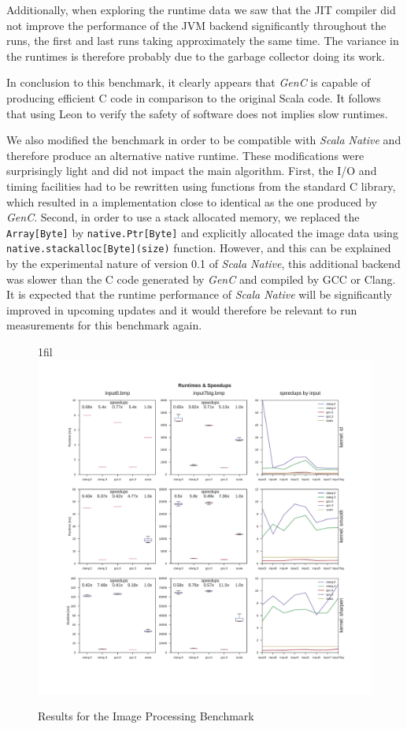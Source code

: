 \documentclass[a4paper,twoside]{article}
\makeatletter
\newcommand{\InlineS}[1]{\lstinline[language=Leon]|#1|}
\newcommand*{\centerfloat}{%
  \parindent \z@
  \leftskip \z@ \@plus 1fil \@minus \textwidth
  \rightskip\leftskip
  \parfillskip \z@skip}
\newcommand{\GenC}{\emph{GenC}\xspace}
\makeatother
\begin{document}
Additionally, when exploring the runtime data we saw that the JIT compiler did
not improve the performance of the JVM backend significantly throughout the
runs, the first and last runs taking approximately the same time. The variance
in the runtimes is therefore probably due to the garbage collector doing its
work.

In conclusion to this benchmark, it clearly appears that \GenC is capable of
producing efficient C code in comparison to the original Scala code. It follows
that using Leon to verify the safety of software does not implies slow runtimes.

We also modified the benchmark in order to be compatible with \emph{Scala
Native}\cite{scala_native} and therefore produce an alternative native runtime.
These modifications were surprisingly light and did not impact the main
algorithm. First, the I/O and timing facilities had to be rewritten using
functions from the standard C library, which resulted in a implementation close
to identical as the one produced by \GenC. Second, in order to use a stack
allocated memory, we replaced the \InlineS{Array[Byte]} by
\InlineS{native.Ptr[Byte]} and explicitly allocated the image data using
\InlineS{native.stackalloc[Byte](size)} function. However, and this can be
explained by the experimental nature of version 0.1 of \emph{Scala Native}, this
additional backend was slower than the C code generated by \GenC and compiled by
GCC or Clang. It is expected that the runtime performance of \emph{Scala Native}
will be significantly improved in upcoming updates and it would therefore be
relevant to run measurements for this benchmark again.


\begin{figure}[!h]
  \centerfloat
  \includegraphics[width=1.25\textwidth]{res/improc_results.pdf}
  \caption{Results for the Image Processing Benchmark}
  \label{fig:improc-res}
\end{figure}
\end{document}
